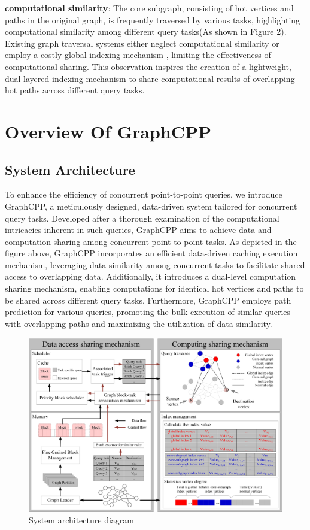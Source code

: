 \documentclass[lettersize,journal]{IEEEtran} %
\begin{document}
{\bf{computational similarity}}: The core subgraph, consisting of hot vertices and paths in the original graph, is frequently traversed by various tasks, highlighting computational similarity among different query tasks(As shown in Figure 2). Existing graph traversal systems either neglect computational similarity\cite{pnp} or employ a costly global indexing mechanism \cite{tripoline}\cite{SGraph}, limiting the effectiveness of computational sharing. This observation inspires the creation of a lightweight, dual-layered indexing mechanism to share computational results of overlapping hot paths across different query tasks. 

\section{Overview Of GraphCPP}

\subsection{System Architecture}
To enhance the efficiency of concurrent point-to-point queries, we introduce GraphCPP, a meticulously designed, data-driven system tailored for concurrent query tasks. Developed after a thorough examination of the computational intricacies inherent in such queries, GraphCPP aims to achieve data and computation sharing among concurrent point-to-point tasks. As depicted in the figure above, GraphCPP incorporates an efficient data-driven caching execution mechanism, leveraging data similarity among concurrent tasks to facilitate shared access to overlapping data. Additionally, it introduces a dual-level computation sharing mechanism, enabling computations for identical hot vertices and paths to be shared across different query tasks. Furthermore, GraphCPP employs path prediction for various queries, promoting the bulk execution of similar queries with overlapping paths and maximizing the utilization of data similarity. 

\begin{figure}[!t]
    \centering
    \includegraphics[width=\columnwidth]{系统架构.png}
    \caption{System architecture diagram}
    \label{fig:系统架构}
  \end{figure}
  
\end{document}
